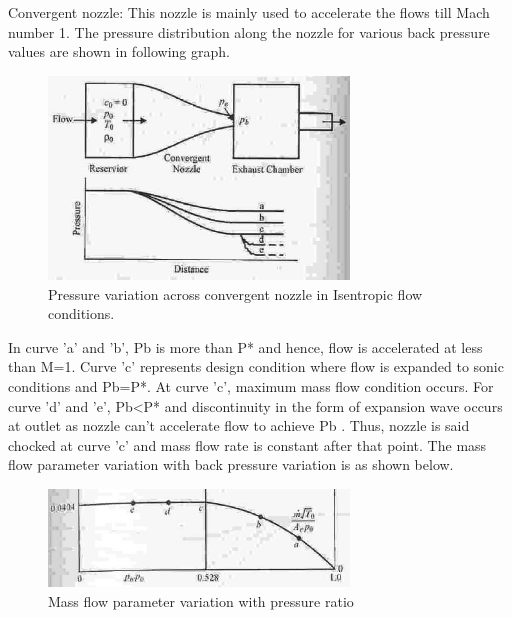 {\Large Convergent nozzle:}
This nozzle is mainly used to accelerate the flows till Mach number 1. The pressure distribution along the nozzle for various back pressure values are
shown in following graph.
\begin{figure}[!h]
    \centering
    \includegraphics[width=8cm]{convergentNozzle.jpg}
    \caption{Pressure variation across convergent nozzle in Isentropic flow
conditions.}
\end{figure}
\newline
In curve 'a' and 'b', Pb is more than P* and hence, flow is accelerated at less than M=1. Curve 'c' represents design condition where flow is expanded to sonic conditions and Pb=P*. At curve 'c', maximum mass flow condition occurs. For curve 'd' and 'e', Pb<P* and discontinuity in the form of expansion wave occurs at outlet as nozzle can’t accelerate flow to achieve Pb . Thus, nozzle is said chocked at curve 'c' and mass flow rate is constant after that point. The mass flow parameter variation with back pressure variation is as shown below.
\begin{figure}[!h]
    \centering
    \includegraphics[width=8cm]{convergentMassFlow.jpg}
    \caption{Mass flow parameter variation with pressure ratio}
\end{figure}
\newpage

